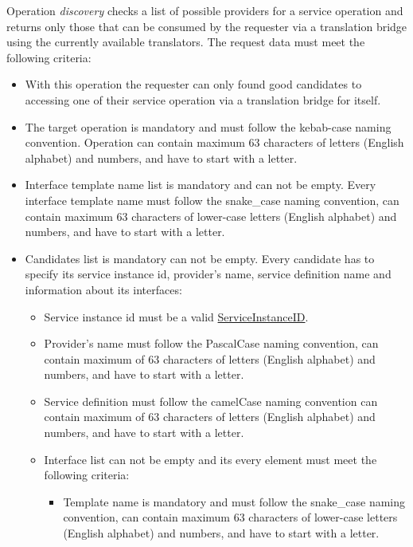 \documentclass[a4paper]{arrowhead}
\newcommand{\pref}[1]{{\textcolor{ArrowheadGrey}{\hyperref[sec:model:primitives:#1]{#1}}}}
\begin{document}
{}

Operation \textit{discovery} checks a list of possible providers for a service operation and returns only those that can be consumed by the requester via a translation bridge using the currently available translators. The request data must meet the following criteria:

\begin{itemize}
    \item With this operation the requester can only found good candidates to accessing one of their service operation via a translation bridge for itself. 
    \item The target operation is mandatory and must follow the kebab-case naming convention.  Operation can contain maximum 63 characters of letters (English alphabet) and numbers, and have to start with a letter.
    \item Interface template name list is mandatory and can not be empty. Every interface template name must follow the snake\_case naming convention, can contain maximum 63 characters of lower-case letters (English alphabet) and numbers, and have to start with a letter.
    \item Candidates list is mandatory can not be empty. Every candidate has to specify its service instance id, provider's name, service definition name and information about its interfaces:
    \begin{itemize}
        \item Service instance id must be a valid \pref{ServiceInstanceID}.
        \item Provider's name must follow the PascalCase naming convention, can contain maximum of 63 characters of letters (English alphabet) and numbers, and have to start with a letter.
        \item Service definition must follow the camelCase naming convention can contain maximum of 63 characters of letters (English alphabet) and numbers, and have to start with a letter.
        \item Interface list can not be empty and its every element must meet the following criteria:
        \begin{itemize}
            \item Template name is mandatory and must follow the snake\_case naming convention, can contain maximum 63 characters of lower-case letters (English alphabet) and numbers, and have to start with a letter.

\end{itemize}
\end{itemize}
\end{itemize}
\end{document}

